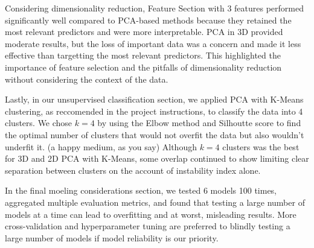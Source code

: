 \documentclass[
  letterpaper,
  DIV=11,
  numbers=noendperiod]{scrartcl}
\begin{document}
Considering dimensionality reduction, Feature Section with 3 features
performed significantly well compared to PCA-based methods because they
retained the most relevant predictors and were more interpretable. PCA
in 3D provided moderate results, but the loss of important data was a
concern and made it less effective than targetting the most relevant
predictors. This highlighted the importance of feature selection and the
pitfalls of dimensionality reduction without considering the context of
the data.

Lastly, in our unsupervised classification section, we applied PCA with
K-Means clustering, as reccomended in the project instructions, to
classify the data into 4 clusters. We chose \(k=4\) by using the Elbow
method and Silhoutte score to find the optimal number of clusters that
would not overfit the data but also wouldn't underfit it. (a happy
medium, as you say) Although \(k=4\) clusters was the best for 3D and 2D
PCA with K-Means, some overlap continued to show limiting clear
separation between clusters on the account of instability index alone.

In the final moeling considerations section, we tested 6 models 100
times, aggregated multiple evaluation metrics, and found that testing a
large number of models at a time can lead to overfitting and at worst,
misleading results. More cross-validation and hyperparameter tuning are
preferred to blindly testing a large number of models if model
reliability is our priority.
\end{document}
